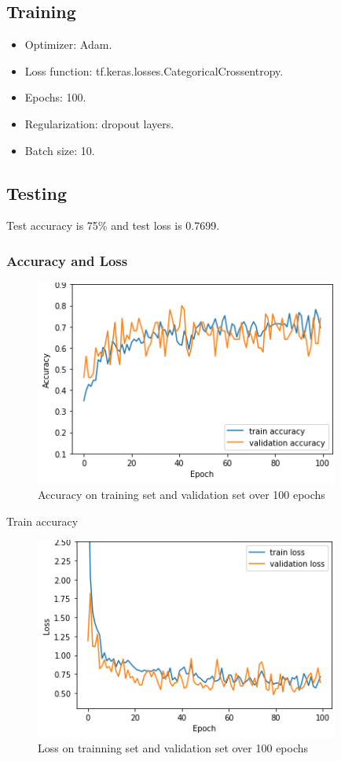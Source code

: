 \documentclass[a4paper,12pt]{article}
\begin{document}
\subsection{Training}
\begin{itemize}
  \item Optimizer: Adam.
  \item Loss function: tf.keras.losses.CategoricalCrossentropy.
  \item Epochs: 100.
  \item Regularization: dropout layers.
  \item Batch size: 10.
\end{itemize}

\subsection{Testing}
Test accuracy is 75\% and test loss is 0.7699.
\subsubsection{Accuracy and Loss}
\begin{figure}[H]
  \centering
  \includegraphics[width=10cm]{./images/task2-accuracy.png}
     \caption{Accuracy on training set and validation set over 100 epochs}
        \label{task2-accuracy}
\end{figure}

Train accuracy 

\begin{figure}[H]
  \centering
  \includegraphics[width=10cm]{./images/task2-loss.png}
     \caption{Loss on trainning set and validation set over 100 epochs}
        \label{task2-loss}
\end{figure}
\end{document}
